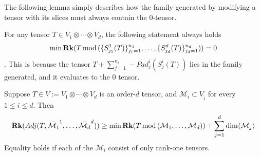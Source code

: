 \documentclass[../Lael_John_MasterThesis_Draft.tex]{subfiles}
\begin{document}
The following lemma simply describes how the family generated by modifying a tensor with its slices must always contain the $0$-tensor.
\begin{remark}
    For any tensor $T \in V_1 \otimes \cdots \otimes V_d$, the following statement always holds $$\min \textbf{Rk}(T\text{\,mod\,}(\{S^1_{j_1}(T)\}_{j_1 = 1}^{n_1}, \ldots, \{S^d_{j_d}(T)\}_{j_d = 1}^{n_d})) = 0$$. This is because the tensor $T + \sum_{j=1}^{n_i} -Pad^i_j(S^i_j(T))$ lies in the family generated, and it evaluates to the $0$ tensor.
\end{remark} 
\begin{theorem}\label{thm:computingrankpostadjoin}
    Suppose $T \in V:= V_1 \otimes \cdots \otimes V_d$ is an order-$d$ tensor, and $\mathcal{M}_i \subset V_{\hat{i}}$ for every $1 \leq i \leq d$. Then
    \begin{equation}\label{eqn:computingrankpostadjoin}
        \textbf{Rk}( Adj(T, \bar{\mathcal{M}_1}^1, \ldots, \bar{\mathcal{M}_d}^d)) \geq \min \textbf{Rk} (T\text{\,mod\,}(\mathcal{M}_1, \ldots, \mathcal{M}_d)) + \sum_{j=1}^{d} \dim \langle \mathcal{M}_j\rangle
    \end{equation}
    Equality holds if each of the $\mathcal{M}_i$ consist of only rank-one tensors.
\end{theorem}
\end{document}
